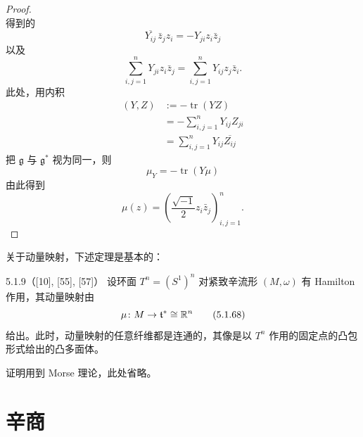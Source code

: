 \begin{proof}
\begin{equation}
    \tag{5.1.60}
  \end{equation}
  得到的
  \begin{equation}
    \overline{Y_{ij}}\,\bar z_jz_i=-Y_{ji}z_i\bar z_j
    \tag{5.1.61}
  \end{equation}
  以及
  \begin{equation}
    \sum_{i,j=1}^n Y_{ji}z_i\bar z_j=\sum_{i,j=1}^n Y_{ij}z_j\bar z_i.
    \tag{5.1.62}
  \end{equation}
  此处，用内积
  \begin{align}
    (Y,Z)&:=-\operatorname{tr}(YZ) \tag{5.1.63}\\
    &=-\sum_{i,j=1}^n Y_{ij}Z_{ji} \tag{5.1.64}\\
    &=\sum_{i,j=1}^n Y_{ij}\overline{Z_{ij}} \tag{5.1.65}
  \end{align}
  把 $\mathfrak{g}$ 与 $\mathfrak{g}^*$ 视为同一，则
  \begin{equation}
    \mu_Y=-\operatorname{tr}(Y\mu)
    \tag{5.1.66}
  \end{equation}
  由此得到
  \begin{equation}
    \mu(z)=\left(\frac{\sqrt{-1}}{2}z_i\bar z_j\right)_{i,j=1}^n.
    \tag{5.1.67}
  \end{equation}
\end{proof}

关于动量映射，下述定理是基本的：

\begin{theorem}{5.1.9（[10], [55], [57]）}
  设环面 $T^n=(S^1)^n$ 对紧致辛流形 $(M,\omega)$ 有 Hamilton 作用，其动量映射由
  \begin{equation}
    \mu\colon M\to\mathfrak{t}^*\cong\mathbb{R}^n
    \tag{5.1.68}
  \end{equation}
  给出。此时，动量映射的任意纤维都是连通的，其像是以 $T^n$ 作用的固定点的凸包形式给出的凸多面体。
\end{theorem}

证明用到 Morse 理论，此处省略。


\section{辛商}

